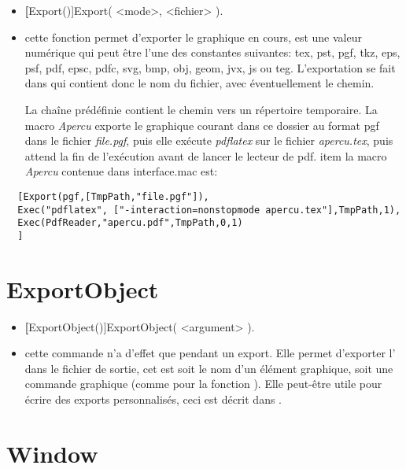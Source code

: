 \begin{itemize}
 \item \util \textbf[Export()]{Export( <mode>, <fichier> )}.
 \item \desc cette fonction permet d'exporter le graphique en cours,  est une valeur numérique qui peut être l'une des constantes suivantes: tex, pst, pgf, tkz, eps, psf, pdf, epsc, pdfc, svg, bmp, obj, geom, jvx, js ou teg. L'exportation se fait dans  qui contient donc le nom du fichier, avec éventuellement le chemin. 
 
 La chaîne prédéfinie  contient le chemin vers un répertoire temporaire. La macro \textit{Apercu} exporte le graphique courant dans ce dossier au format pgf dans le fichier \textit{file.pgf}, puis elle exécute \textit{pdflatex} sur le fichier \textit{apercu.tex}, puis attend la fin de l'exécution avant de lancer le lecteur de pdf.
 item \exem la macro \textsl{Apercu} contenue dans interface.mac est:
\end{itemize}

\begin{verbatim}
  [Export(pgf,[TmpPath,"file.pgf"]), 
  Exec("pdflatex", ["-interaction=nonstopmode apercu.tex"],TmpPath,1),
  Exec(PdfReader,"apercu.pdf",TmpPath,0,1)
  ]
\end{verbatim}

\section{ExportObject}\label{cmdExportObject}

\begin{itemize}
 \item \textbf[ExportObject()]{ExportObject( <argument> )}.
 \item \desc cette commande n'a d'effet que pendant un export. Elle permet d'exporter l' dans le fichier de sortie, cet  est soit le nom d'un élément graphique, soit une commande graphique (comme pour la fonction ). Elle peut-être utile pour écrire des exports personnalisés, ceci est décrit dans .
\end{itemize}

\section{Window}\label{cmdFenetre}

